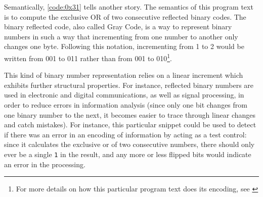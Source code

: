 \begin{listing}
    \inputminted{asm}{./corpus/riddle_0x31.asm}
    \caption{\emph{0x31.asm} - This Assembly listing represents a pair of numbers as reflected binary numbers, and then performs a logical \lstinline{xor} operation on a pair of numbers. The structure of the program text itself, through its symmetry, hints at the patterns exhibited by such reflected binary encoding \citep{xorpd_xchg_2014}.}
    \label{code:0x31}
\end{listing}

Semantically, \autoref{code:0x31} tells another story. The semantics of this program text is to compute the exclusive OR of two consecutive reflected binary codes. The binary reflected code, also called Gray Code, is a way to represent binary numbers in such a way that incrementing from one number to another only changes one byte. Following this notation, incrementing from 1 to 2 would be written from 001 to 011 rather than from 001 to 010\footnote{For more details on how this particular program text does its encoding, see \citep{sanchez_solutions_2016}}.

This kind of binary number representation relies on a linear increment which exhibits further structural properties. For instance, reflected binary numbers are used in electronic and digital communications, as well as signal processing, in order to reduce errors in information analysis (since only one bit changes from one binary number to the next, it becomes easier to trace through linear changes and catch mistakes). For instance, this particular snippet could be used to detect if there was an error in an encoding of information by acting as a test control: since it calculates the exclusive or of two consecutive numbers, there should only ever be a single \lstinline{1} in the result, and any more or less flipped bits would indicate an error in the processing.

